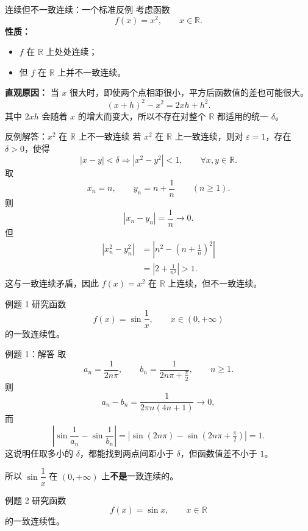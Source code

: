 ﻿\documentclass[aspectratio=169,11pt]{ctexbeamer}
\newcommand{\R}{\mathbb{R}}
\begin{document}
\begin{frame}{连续但不一致连续：一个标准反例}
考虑函数
\[
  f(x)=x^2,\qquad x\in\R.
\]
\textbf{性质：}
\begin{itemize}
  \item $f$ 在 $\R$ 上处处连续；
  \item 但 $f$ 在 $\R$ 上并不一致连续。
\end{itemize}
\vspace{0.5em}

\textbf{直观原因：}
当 $x$ 很大时，即使两个点相距很小，平方后函数值的差也可能很大。
\[
  (x+h)^2-x^2=2xh+h^2.
\]
其中 $2xh$ 会随着 $x$ 的增大而变大，所以不存在对整个 $\R$ 都适用的统一 $\delta$。
\end{frame}

\begin{frame}[allowframebreaks]{反例解答：$x^2$ 在 $\R$ 上不一致连续}
若 $x^2$ 在 $\R$ 上一致连续，则对 $\varepsilon=1$，存在 $\delta>0$，使得
\[
  |x-y|<\delta \Longrightarrow |x^2-y^2|<1,\qquad \forall x,y\in\R.
\]
取
\[
  x_n=n,\qquad y_n=n+\frac{1}{n}\qquad (n\ge 1).
\]
则
\[
  |x_n-y_n|=\frac1n\to 0.
\]
但
\begin{align*}
  |x_n^2-y_n^2|
  &=\left|n^2-\left(n+\frac1n\right)^2\right| \\
  &=\left|2+\frac1{n^2}\right|
  >1.
\end{align*}
这与一致连续矛盾，因此 $f(x)=x^2$ 在 $\R$ 上连续，但不一致连续。
\end{frame}

\begin{frame}{例题 1}
研究函数
\[
  f(x)=\sin\dfrac1x,\qquad x\in(0,+\infty)
\]
的一致连续性。
\end{frame}

\begin{frame}{例题 1：解答}
取
\[
  a_n=\frac{1}{2n\pi},\qquad b_n=\frac{1}{2n\pi+\frac{\pi}{2}},\qquad n\ge 1.
\]
则
\[
  a_n-b_n=\frac{1}{2\pi n(4n+1)}\to 0,
\]
而
\[
  \left|\sin\frac1{a_n}-\sin\frac1{b_n}\right|
  =
  |\sin(2n\pi)-\sin(2n\pi+\tfrac{\pi}{2})|
  =1.
\]
这说明任取多小的 $\delta$，都能找到两点间距小于 $\delta$，但函数值差不小于 $1$。
\vspace{0.4em}

所以 $\sin\dfrac1x$ 在 $(0,+\infty)$ 上\textbf{不是}一致连续的。
\end{frame}

\begin{frame}{例题 2}
研究函数
\[
  f(x)=\sin x,\qquad x\in\R
\]
的一致连续性。
\end{frame}
\end{document}
